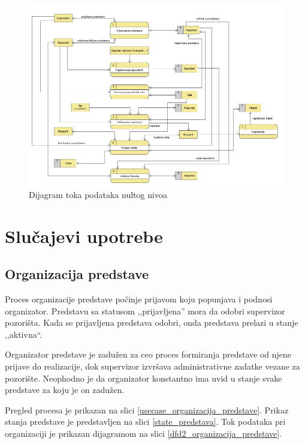 \documentclass[a4paper]{article}
\begin{document}
\begin{figure}[H]
  \begin{center}
      \includegraphics[width=140mm]{../images/dfd1.png}
  \end{center}
  \caption{Dijagram toka podataka nultog nivoa}
  \label{dfd1}
\end{figure}

\section{Slučajevi upotrebe}

\subsection{Organizacija predstave}
Proces organizacije predstave počinje prijavom koju popunjava i podnosi organizator. Predstavu sa statusom ,,prijavljena'' mora da odobri supervizor pozorišta. Kada se prijavljena predstava odobri, onda predstava prelazi u stanje ,,aktivna``. 

Organizator predstave je zadužen za ceo proces formiranja predstave od njene prijave do realizacije, dok supervizor izvršava administrativne zadatke vezane za pozorište. Neophodno je da organizator konstantno ima uvid u stanje svake predstave za koju je on zadužen. 

Pregled procesa je prikazan na slici \ref{usecase_organizacija_predstave}. Prikaz stanja predstave je predstavljen na slici \ref{state_predstava}. Tok podataka pri organizaciji je prikazan dijagramom na slici \ref{dfd2_organizacija_predstave}. 
\end{document}
